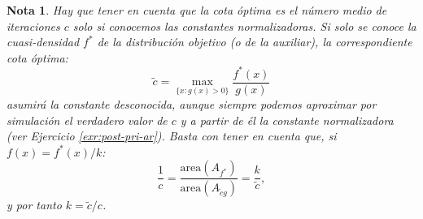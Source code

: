 \documentclass[
  spanish,
  10pt,
]{book}
\theoremstyle{break}
\theoremstyle{nonumberplain}
\newtheorem{remark}{Nota}
\begin{document}
\begin{remark}
Hay que tener en cuenta que la cota óptima es el número medio de iteraciones \(c\) solo si conocemos las constantes normalizadoras.
Si solo se conoce la cuasi-densidad \(f^{\ast}\) de la distribución objetivo (o de la auxiliar), la correspondiente cota óptima:
\[\tilde{c} = \max_{\{x : g(x) > 0\}} \frac{f^{\ast}(x)}{g(x)}\]
asumirá la constante desconocida, aunque siempre podemos aproximar por simulación el verdadero valor de \(c\) y a partir de él la constante normalizadora (ver Ejercicio \ref{exr:post-pri-ar}).
Basta con tener en cuenta que, si \(f(x) = f^{\ast}(x)/k\):
\[\frac{1}{c} = \frac{\text{area}\left(A_{f^{\ast}}\right)}{\text{area}\left( A_{\tilde{c}g}\right)} = \frac{k}{\tilde{c}},\]
y por tanto \(k= \tilde{c}/c\).
\end{remark}
\end{document}
